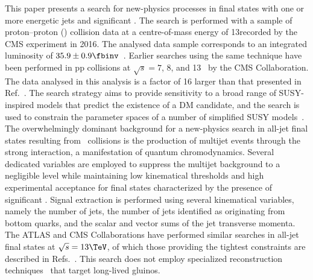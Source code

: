 This paper presents a search for new-physics processes in final states
with one or more energetic jets and significant \ptvecmiss. The search
is performed with a sample of proton--proton (\Pp\Pp) collision data at
a centre-of-mass energy of 13\TeV recorded by the CMS experiment in 2016.
The analysed data sample corresponds to an integrated luminosity of $35.9
\pm 0.9\fbinv$~\cite{CMS:2017sdi}. Earlier searches using the same technique have been
performed in pp collisions at $\sqrt{s} = 7$, 8, and
13\TeV~\cite{Khachatryan:2011tk, Chatrchyan:2011zy, Chatrchyan:2012wa,
  Chatrchyan:2013mys, Khachatryan:2016pxa, Khachatryan:2016dvc} 
by the CMS Collaboration. The data
analysed in this analysis is a factor of 16 larger than that
presented in Ref.~\cite{Khachatryan:2016dvc}. The search strategy aims
to provide sensitivity to a broad range of SUSY-inspired
models that predict the existence of a DM candidate, and the search is
used to constrain the parameter spaces of a number of simplified SUSY
models~\cite{Alwall:2008ag, Alwall:2008va, sms}. The overwhelmingly
dominant background for a new-physics search in all-jet final states
resulting from \Pp\Pp\ collisions is the production of multijet events
through the strong interaction, a manifestation of quantum
chromodynamics. Several dedicated variables are employed to suppress
the multijet background to a negligible level while maintaining low
kinematical thresholds and high experimental acceptance for final
states characterized by the presence of significant \ptvecmiss. Signal
extraction is performed using several kinematical variables, namely
the number of jets, the number of jets identified as originating from
bottom quarks, and the scalar and vector sums of the jet transverse
momenta. The ATLAS and CMS Collaborations have performed similar
searches in all-jet final states at $\sqrt{s} = 13\TeV$, of which
those providing the tightest constraints are described in
Refs.~\cite{Aaboud:2016zdn, Sirunyan:2017cwe, Sirunyan:2017kqq}. This
search does not employ specialized reconstruction
techniques~\cite{Aaboud:2017iio, Aaboud:2016uth, Aaboud:2016dgf,
  Aad:2013gva, Khachatryan:2016sfv, Khachatryan:2015jha} that target
long-lived gluinos.



